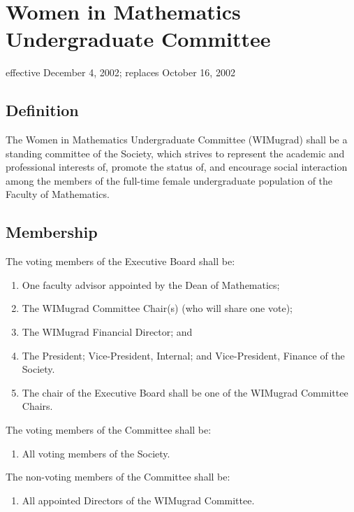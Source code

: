 \section{Women in Mathematics Undergraduate Committee}
effective December 4, 2002; replaces October 16, 2002

\subsection{Definition}
The Women in Mathematics Undergraduate Committee (WIMugrad) shall be a standing committee of the Society, which strives to represent the academic and professional interests of, promote the status of, and encourage social interaction among the members of the full-time female undergraduate population of the Faculty of Mathematics.

\subsection{Membership}
The voting members of the Executive Board shall be:
\begin{enumerate}
\item One faculty advisor appointed by the Dean of Mathematics;
\item The WIMugrad Committee Chair(s) (who will share one vote);
\item The WIMugrad Financial Director; and
\item The President; Vice-President, Internal; and Vice-President, Finance of the Society.
\item The chair of the Executive Board shall be one of the WIMugrad Committee Chairs.
\end{enumerate}
The voting members of the Committee shall be:
\begin{enumerate}
\item All voting members of the Society.
\end{enumerate}
The non-voting members of the Committee shall be:
\begin{enumerate}
\item All appointed Directors of the WIMugrad Committee.
\end{enumerate}

